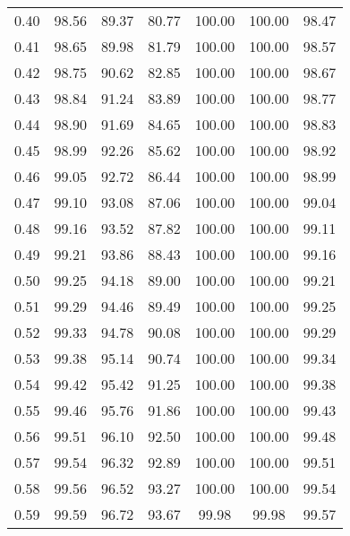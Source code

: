 \begin{tabular}{|c|c|c|c|c|c|c|}
      0.40 &     98.56 &     89.37 &      80.77 &  100.00 &     100.00 &         98.47 \\
      0.41 &     98.65 &     89.98 &      81.79 &  100.00 &     100.00 &         98.57 \\
      0.42 &     98.75 &     90.62 &      82.85 &  100.00 &     100.00 &         98.67 \\
      0.43 &     98.84 &     91.24 &      83.89 &  100.00 &     100.00 &         98.77 \\
      0.44 &     98.90 &     91.69 &      84.65 &  100.00 &     100.00 &         98.83 \\
      0.45 &     98.99 &     92.26 &      85.62 &  100.00 &     100.00 &         98.92 \\
      0.46 &     99.05 &     92.72 &      86.44 &  100.00 &     100.00 &         98.99 \\
      0.47 &     99.10 &     93.08 &      87.06 &  100.00 &     100.00 &         99.04 \\
      0.48 &     99.16 &     93.52 &      87.82 &  100.00 &     100.00 &         99.11 \\
      0.49 &     99.21 &     93.86 &      88.43 &  100.00 &     100.00 &         99.16 \\
      0.50 &     99.25 &     94.18 &      89.00 &  100.00 &     100.00 &         99.21 \\
      0.51 &     99.29 &     94.46 &      89.49 &  100.00 &     100.00 &         99.25 \\
      0.52 &     99.33 &     94.78 &      90.08 &  100.00 &     100.00 &         99.29 \\
      0.53 &     99.38 &     95.14 &      90.74 &  100.00 &     100.00 &         99.34 \\
      0.54 &     99.42 &     95.42 &      91.25 &  100.00 &     100.00 &         99.38 \\
      0.55 &     99.46 &     95.76 &      91.86 &  100.00 &     100.00 &         99.43 \\
      0.56 &     99.51 &     96.10 &      92.50 &  100.00 &     100.00 &         99.48 \\
      0.57 &     99.54 &     96.32 &      92.89 &  100.00 &     100.00 &         99.51 \\
      0.58 &     99.56 &     96.52 &      93.27 &  100.00 &     100.00 &         99.54 \\
      0.59 &     99.59 &     96.72 &      93.67 &   99.98 &      99.98 &         99.57 \\

\end{tabular}
